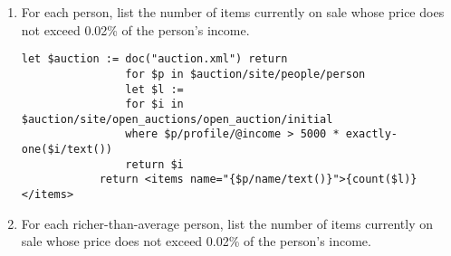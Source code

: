 \begin{enumerate}[label=Q\arabic*.]
\begin{lstlisting}[style=XQuery]
		\end{lstlisting}	
		\item  %
			For each person, list the number of items currently on sale whose price does not exceed 0.02\% of the person’s income.
		\begin{lstlisting}[style=XQuery]
			let $auction := doc("auction.xml") return
				for $p in $auction/site/people/person
				let $l :=
				for $i in $auction/site/open_auctions/open_auction/initial
				where $p/profile/@income > 5000 * exactly-one($i/text())
				return $i
			return <items name="{$p/name/text()}">{count($l)}</items>
		\end{lstlisting}	
		\item %
		For each richer-than-average person, list the number of items currently on sale whose price does not exceed 0.02\% of the person’s income.
		

\end{enumerate}

